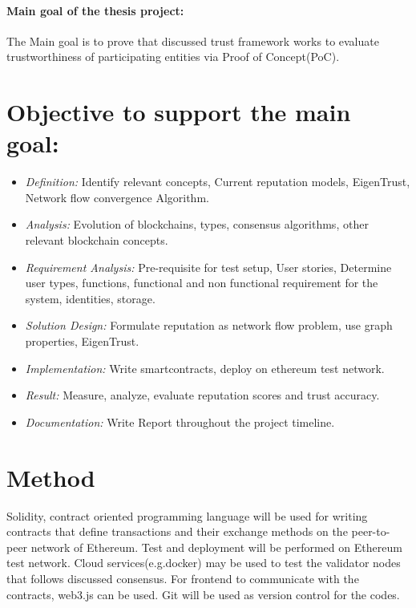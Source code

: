 \documentclass[a4paper,11pt,dvipsnames]{article}
\begin{document}
	\paragraph{Main goal of the thesis project:}
	The Main goal is to prove that discussed trust framework works to evaluate 
	trustworthiness of participating entities via Proof of Concept(PoC).
	
	\section*{Objective to support the main goal: }
	\begin{itemize}
		\item \textit{Definition:} Identify relevant concepts, Current 
			reputation models, EigenTrust, Network flow convergence Algorithm.
		\item \textit{Analysis:} Evolution of blockchains, types, consensus 
			algorithms, other relevant blockchain concepts.
		\item \textit{Requirement Analysis:} Pre-requisite for test setup, 
			User stories, Determine user types, functions, functional and 
			non functional requirement for the system, identities, storage.
		\item \textit{Solution Design:} Formulate reputation as network flow 
			problem, use graph properties, EigenTrust.
		\item \textit{Implementation:} Write smartcontracts, deploy on ethereum 
			test network. 
		\item \textit{Result:} Measure, analyze, evaluate reputation scores 
			and trust accuracy.
		\item \textit{Documentation:} Write Report throughout the project 
			timeline. 
	\end{itemize}

	\section*{Method}
	Solidity, \cite{solidity} contract oriented programming language will be 
	used for writing contracts that define transactions and their exchange 
	methods on the peer-to-peer network of Ethereum. \cite{ethereum_whitepaper} 
	Test and deployment will be performed on Ethereum test network. Cloud 
	services(e.g.docker) may be used to test the validator nodes that follows 
	discussed consensus. For frontend to communicate with the contracts, 
	web3.js can be used. Git will be used as version control for the codes.
	
\end{document}

